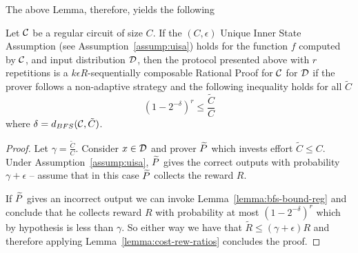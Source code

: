 The above Lemma, therefore, yields the following 

\begin{mythm}
\label{thm:reg-circ}
Let $\cal{C}$ be a regular circuit of size $C$. If the $(C,\epsilon)$ Unique Inner State Assumption (see Assumption~\ref{assump:uisa}) holds for the function $f$ computed by $\cal C$, and input distribution $\cal D$, then the protocol presented above with $r$ repetitions is a $k\epsilon R$-sequentially composable Rational Proof for $\cal{C}$ for $\cal D$ if the prover follows a non-adaptive strategy and the following inequality holds for all $\tilde{C}$ 
	$$ (1-2^{-\delta})^r \leq \frac{\tilde{C}}{C} $$
where $\delta=d_{BFS}({\cal C},\tilde{C})$.
\end{mythm}

\begin{proof}
	Let $\gamma=\frac{\tilde{C}}{C}$. 
Consider $x \in \cal D$ and prover $\widetilde{P}$ which invests effort $\tilde{C}\leq C$. Under Assumption~\ref{assump:uisa}, $\widetilde{P}$ gives the correct outputs
with probability $\gamma+\epsilon$ -- assume that in this case $\widetilde{P}$ collects the reward $R$. 

If $\widetilde{P}$ gives an incorrect output we can invoke Lemma~\ref{lemma:bfs-bound-reg} and conclude that he collects reward  
$R$ with probability at most $(1-2^{-\delta})^r$ which by hypothesis is less than $\gamma$. So either way we have that $\tilde{R} \leq (\gamma + \epsilon)R$ 
and therefore applying Lemma~\ref{lemma:cost-rew-ratios} concludes the proof.
\end{proof}